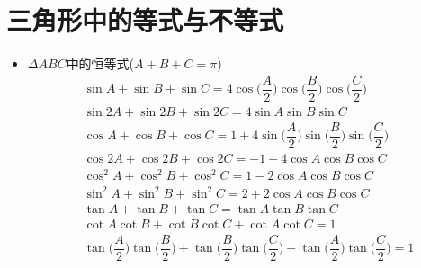 \section{三角形中的等式与不等式}
\begin{itemize}[leftmargin=\inteval{\myitemleftmargin}pt,itemsep=
    \inteval{\myitemitempsep}pt,topsep=\inteval{\myitemtopsep}pt]
    \item $ \Delta ABC $中的恒等式($ A+B+C=\pi $)
\begin{align} 
    &\sin A +\sin B +\sin C =4\cos\Big(\dfrac{A}{2}\Big)
    \cos\Big(\dfrac{B}{2}\Big)\cos\Big(\dfrac{C}{2}\Big) \label{三角恒等式1} \\
    &\sin2A +\sin2B +\sin2C =4\sin A  \sin B \sin C \label{三角恒等式2}\\
    &\cos A +\cos B +\cos C =1+4\sin\Big(\dfrac{A}{2}\Big)
    \sin\Big(\dfrac{B}{2}\Big)\sin\Big(\dfrac{C}{2}\Big) \label{三角恒等式3} \\
    &\cos2A +\cos2B +\cos2C =-1-4\cos A\cos B \cos C \label{三角恒等式4} \\	
    &\cos^2A+\cos^2B+\cos^2C =1-2\cos A\cos B\cos C \label{三角恒等式5} \\ 
    &\sin^2A+\sin^2B+\sin^2C =2+2\cos A\cos B\cos C \label{三角恒等式6} \\
    &\tan A+\tan B +\tan C =\tan A \tan B\tan C \label{三角恒等式7}\\
    &\cot A\cot B+\cot B \cot C+\cot A\cot C=1 \label{三角恒等式8}\\
    &\tan\Big(\dfrac{A}{2}\Big)\tan\Big(\dfrac{B}{2}\Big)+
    \tan\Big(\dfrac{B}{2}\Big)\tan\Big(\dfrac{C}{2}\Big)+
    \tan\Big(\dfrac{A}{2}\Big)\tan\Big(\dfrac{C}{2}\Big)=1 \label{三角恒等式-最后}
\end{align}


\end{itemize}
